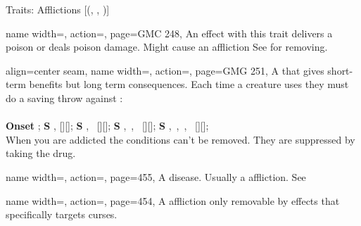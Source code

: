 \begin{PageFront}
\begin{Tables}{\frontTableHeight}
\begin{Table}{Traits: Afflictions }[{(, , )}]
            \begin{entry}{}{%
                name width=\conditionLength,%
                action=\Poison,
                page=GMC 248,
            }
                An effect with this trait delivers a poison or deals poison damage.
                Might cause an affliction \hfill
                See  for removing.
            \end{entry}
            \begin{entry}{}{%
                align=center seam,
                name width=\conditionLength,%
                action=\Drug,
                page=GMG 251,
            }
                A \Poison that gives short-term benefits but long term consequences.
                Each time a creature uses they must do a saving throw against :\\
                \newcommand{\Scaleing}{\scalefont{0.9}}
                \Fortitude[][before=Drug] 
                \hfill{}
                \\{\Scaleing
                \textbf{Onset} ;
                \hfill\textbf{S} \Fatigued, [][\Scaleing];
                \hfill\textbf{S} \Fatigued, \Sickened\, [][\Scaleing];
                \hfill\textbf{S} \Fatigued, \Drained\,, \Sickened\, [][\Scaleing];
                \hfill\textbf{S} \Fatigued, \Drained\,, \Sickened\,,
                    \Stupefied\, [][\Scaleing];}
                \\
                When you are addicted the conditions can't be removed.
                They are suppressed by taking the drug. \hfill
            \end{entry}
            \breakLine
            \begin{entry}{}{%
                name width=\conditionLength,%
                action=\Disease,
                page=455,
            }
                A disease. Usually a affliction. \hfill See 
            \end{entry}
            \breakLine
            \begin{entry}{}{%
                name width=\conditionLength,%
                action=\Curse,
                page=454,
            }
                A affliction only removable by effects that specifically targets curses. \hfill

\end{entry}
\end{Table}
\end{Tables}
\end{PageFront}
